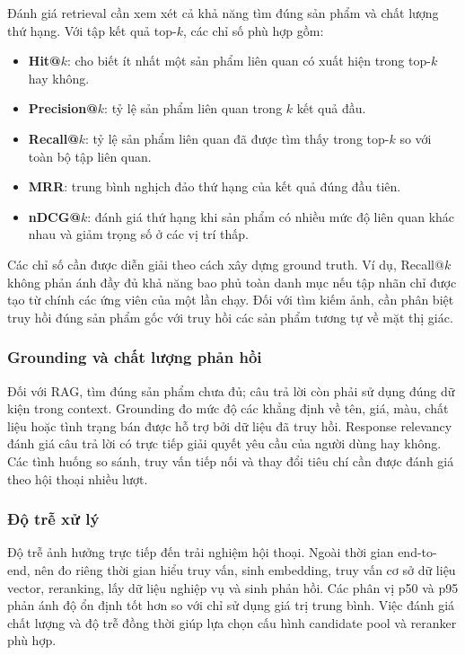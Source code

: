 Đánh giá retrieval cần xem xét cả khả năng tìm đúng sản phẩm và chất lượng thứ hạng. Với tập kết quả top-$k$, các chỉ số phù hợp gồm:

\begin{itemize}
    \item \textbf{Hit@$k$}: cho biết ít nhất một sản phẩm liên quan có xuất hiện trong top-$k$ hay không.
    \item \textbf{Precision@$k$}: tỷ lệ sản phẩm liên quan trong $k$ kết quả đầu.
    \item \textbf{Recall@$k$}: tỷ lệ sản phẩm liên quan đã được tìm thấy trong top-$k$ so với toàn bộ tập liên quan.
    \item \textbf{MRR}: trung bình nghịch đảo thứ hạng của kết quả đúng đầu tiên.
    \item \textbf{nDCG@$k$}: đánh giá thứ hạng khi sản phẩm có nhiều mức độ liên quan khác nhau và giảm trọng số ở các vị trí thấp.
\end{itemize}

Các chỉ số cần được diễn giải theo cách xây dựng ground truth. Ví dụ, Recall@$k$ không phản ánh đầy đủ khả năng bao phủ toàn danh mục nếu tập nhãn chỉ được tạo từ chính các ứng viên của một lần chạy. Đối với tìm kiếm ảnh, cần phân biệt truy hồi đúng sản phẩm gốc với truy hồi các sản phẩm tương tự về mặt thị giác.

\subsubsection{Grounding và chất lượng phản hồi}

Đối với RAG, tìm đúng sản phẩm chưa đủ; câu trả lời còn phải sử dụng đúng dữ kiện trong context. Grounding đo mức độ các khẳng định về tên, giá, màu, chất liệu hoặc tình trạng bán được hỗ trợ bởi dữ liệu đã truy hồi. Response relevancy đánh giá câu trả lời có trực tiếp giải quyết yêu cầu của người dùng hay không. Các tình huống so sánh, truy vấn tiếp nối và thay đổi tiêu chí cần được đánh giá theo hội thoại nhiều lượt.

\subsubsection{Độ trễ xử lý}

Độ trễ ảnh hưởng trực tiếp đến trải nghiệm hội thoại. Ngoài thời gian end-to-end, nên đo riêng thời gian hiểu truy vấn, sinh embedding, truy vấn cơ sở dữ liệu vector, reranking, lấy dữ liệu nghiệp vụ và sinh phản hồi. Các phân vị p50 và p95 phản ánh độ ổn định tốt hơn so với chỉ sử dụng giá trị trung bình. Việc đánh giá chất lượng và độ trễ đồng thời giúp lựa chọn cấu hình candidate pool và reranker phù hợp.

